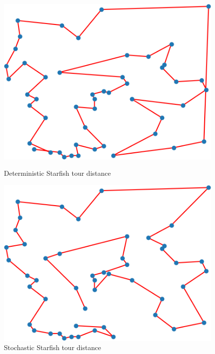 \documentclass[12pt]{article}
\begin{document}
\begin{figure}[H]
\centering
\begin{minipage}{.45\textwidth}
  \centering
  \includegraphics[width=.75\linewidth]{images/p2_star_det_1}
  \caption{Deterministic Starfish tour distance}
  \label{fig:p2_star_det_1}
\end{minipage}\hfill
\begin{minipage}{.45\textwidth}
  \centering
  \includegraphics[width=.75\linewidth]{images/p2_star_stoch_1}
  \caption{Stochastic Starfish tour distance}
  \label{fig:p2_star_stoch_1}
\end{minipage}
\end{figure}
\end{document}
